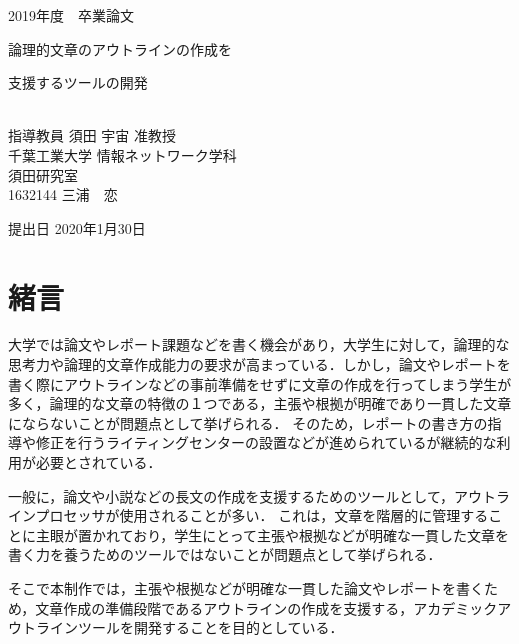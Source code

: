 \documentclass[a4j,12pt]{jarticle}
\begin{document}
\begin{center}
\thispagestyle{empty}
\vspace*{5zh}
\huge
2019年度　卒業論文\\[50pt]
{\Huge 論理的文章のアウトラインの作成を

支援するツールの開発}\\
[80pt]
\huge
指導教員 須田 宇宙 准教授\\[30pt]
千葉工業大学 情報ネットワーク学科\\[10pt]
須田研究室\\[60pt]
1632144 \hspace{70pt} 三浦　恋\\[75pt]
\end{center}
\vspace*{-2cm}
\begin{flushright} 
\huge
提出日 2020年1月30日
\end{flushright}
\large%
\newpage

\tableofcontents%
\clearpage
\newpage

\listoffigures%
\thispagestyle{empty}
\clearpage
\addtocounter{page}{-1}
\newpage


\section{緒言}

大学では論文やレポート課題などを書く機会があり，大学生に対して，論理的な思考力や論理的文章作成能力の要求が高まっている．しかし，論文やレポートを書く際にアウトラインなどの事前準備をせずに文章の作成を行ってしまう学生が多く，論理的な文章の特徴の１つである，主張や根拠が明確であり一貫した文章にならないことが問題点として挙げられる．
そのため，レポートの書き方の指導や修正を行うライティングセンターの設置などが進められているが継続的な利用が必要とされている．

一般に，論文や小説などの長文の作成を支援するためのツールとして，アウトラインプロセッサが使用されることが多い．
これは，文章を階層的に管理することに主眼が置かれており，学生にとって主張や根拠などが明確な一貫した文章を書く力を養うためのツールではないことが問題点として挙げられる．

そこで本制作では，主張や根拠などが明確な一貫した論文やレポートを書くため，文章作成の準備段階であるアウトラインの作成を支援する，アカデミックアウトラインツールを開発することを目的としている．
\newpage
\end{document}
